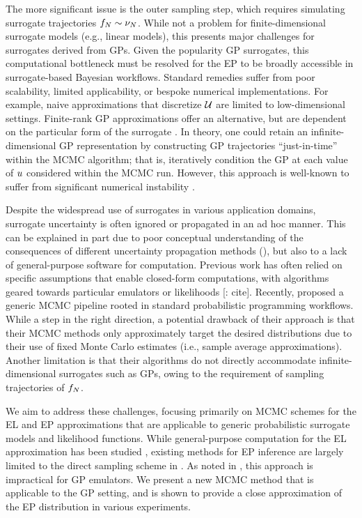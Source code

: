 \documentclass[12pt]{article}
\begin{document}
The more significant issue is the outer sampling step, which requires simulating surrogate 
trajectories $f_{N} \sim \nu_{N}$. While not a problem for finite-dimensional 
surrogate models (e.g., linear models), this presents major challenges for surrogates 
derived from GPs. Given the popularity GP surrogates, 
this computational bottleneck must be resolved for the EP to be broadly accessible in 
surrogate-based Bayesian workflows. Standard remedies suffer from poor scalability,
limited applicability, or bespoke numerical implementations. For example, naive 
approximations that discretize $\mathcal{U}$ are limited to low-dimensional settings.
Finite-rank GP approximations offer an alternative, but are dependent on the 
particular form of the surrogate \citep{pathwiseConditioning}. In theory, one 
could retain an infinite-dimensional GP representation by constructing 
GP trajectories ``just-in-time'' within the MCMC algorithm; that is, iteratively
condition the GP at each value of $u$ considered within the MCMC run.
However, this approach is well-known to suffer from significant numerical 
instability \citep{pathwiseConditioning}.






Despite the widespread use of surrogates in various application domains, 
surrogate uncertainty is often ignored or propagated in an ad hoc manner.
This can be explained in part due to poor conceptual understanding 
of the consequences of different uncertainty propagation methods
(), but also to a lack of general-purpose software
for computation. Previous work has often relied on specific assumptions that
enable closed-form computations, with algorithms geared towards
particular emulators or likelihoods [\todo: cite]. Recently, \citep{BurknerSurrogate}
proposed a generic MCMC pipeline rooted in standard probabilistic programming
workflows. While a step in the right direction, a potential drawback of their approach
is that their MCMC methods only approximately target the desired distributions 
due to their use of fixed Monte Carlo estimates (i.e., sample average approximations).
Another limitation is that their algorithms do not directly accommodate 
infinite-dimensional surrogates such as GPs, owing to the requirement of 
sampling trajectories of $f_{N}$.

We aim to address these challenges, focusing primarily on MCMC schemes for the EL
and EP approximations that are applicable to generic probabilistic surrogate models 
and likelihood functions. While general-purpose computation for the EL approximation 
has been studied \citep{garegnani2021NoisyMCMC}, existing methods for EP inference
are largely limited to the direct sampling scheme in . As noted in 
\citep{VehtariParallelGP,StuartTeck2}, this approach is impractical for GP emulators.
We present a new MCMC method that is applicable to the GP setting, and is
shown to provide a close approximation of the EP distribution in various experiments.
\end{document}
